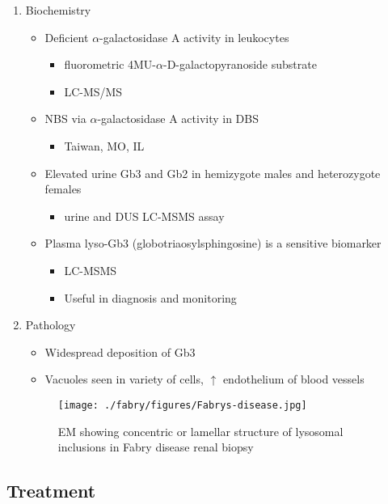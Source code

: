 \documentclass{scrartcl}
\begin{document}
\begin{enumerate}
\item Biochemistry
\label{sec:org8c66134}
\begin{itemize}
\item Deficient \(\alpha\)-galactosidase A activity in leukocytes
\begin{itemize}
\item fluorometric 4MU-\(\alpha\)-D-galactopyranoside substrate
\item LC-MS/MS
\end{itemize}
\item NBS via \(\alpha\)-galactosidase A activity in DBS
\begin{itemize}
\item Taiwan, MO, IL
\end{itemize}
\item Elevated urine Gb3 and Gb2 in hemizygote males and heterozygote females
\begin{itemize}
\item urine and DUS LC-MSMS assay
\end{itemize}
\item Plasma lyso-Gb3 (globotriaosylsphingosine) is a sensitive biomarker
\begin{itemize}
\item LC-MSMS
\item Useful in diagnosis and monitoring
\end{itemize}
\end{itemize}

\item Pathology
\label{sec:org657e471}

\begin{itemize}
\item Widespread deposition of Gb3
\item Vacuoles seen in variety of cells, \(\uparrow\) endothelium of blood vessels
\end{itemize}

\begin{figure}[htbp]
\centering
\texttt{[image: ./fabry/figures/Fabrys-disease.jpg]}
\caption[Fabry EM]{\label{fig:orgff2a7ed}
EM showing concentric or lamellar structure of lysosomal inclusions in Fabry disease renal biopsy}
\end{figure}
\end{enumerate}

\subsection{Treatment}
\label{sec:org5703317}
\end{document}
